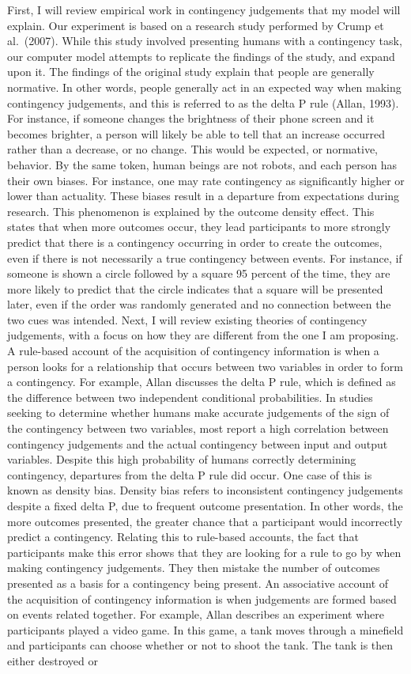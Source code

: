 \documentclass[
  english,
  man,floatsintext]{apa6}
\begin{document}
First, I will review empirical work in contingency judgements that my model will explain. Our experiment is based on a research study performed by Crump et al.~(2007). While this study involved presenting humans with a contingency task, our computer model attempts to replicate the findings of the study, and expand upon it. The findings of the original study explain that people are generally normative. In other words, people generally act in an expected way when making contingency judgements, and this is referred to as the delta P rule (Allan, 1993). For instance, if someone changes the brightness of their phone screen and it becomes brighter, a person will likely be able to tell that an increase occurred rather than a decrease, or no change. This would be expected, or normative, behavior. By the same token, human beings are not robots, and each person has their own biases. For instance, one may rate contingency as significantly higher or lower than actuality. These biases result in a departure from expectations during research. This phenomenon is explained by the outcome density effect. This states that when more outcomes occur, they lead participants to more strongly predict that there is a contingency occurring in order to create the outcomes, even if there is not necessarily a true contingency between events. For instance, if someone is shown a circle followed by a square 95 percent of the time, they are more likely to predict that the circle indicates that a square will be presented later, even if the order was randomly generated and no connection between the two cues was intended. Next, I will review existing theories of contingency judgements, with a focus on how they are different from the one I am proposing. A rule-based account of the acquisition of contingency information is when a person looks for a relationship that occurs between two variables in order to form a contingency. For example, Allan discusses the delta P rule, which is defined as the difference between two independent conditional probabilities. In studies seeking to determine whether humans make accurate judgements of the sign of the contingency between two variables, most report a high correlation between contingency judgements and the actual contingency between input and output variables. Despite this high probability of humans correctly determining contingency, departures from the delta P rule did occur. One case of this is known as density bias. Density bias refers to inconsistent contingency judgements despite a fixed delta P, due to frequent outcome presentation. In other words, the more outcomes presented, the greater chance that a participant would incorrectly predict a contingency. Relating this to rule-based accounts, the fact that participants make this error shows that they are looking for a rule to go by when making contingency judgements. They then mistake the number of outcomes presented as a basis for a contingency being present. An associative account of the acquisition of contingency information is when judgements are formed based on events related together. For example, Allan describes an experiment where participants played a video game. In this game, a tank moves through a minefield and participants can choose whether or not to shoot the tank. The tank is then either destroyed or 
\end{document}
